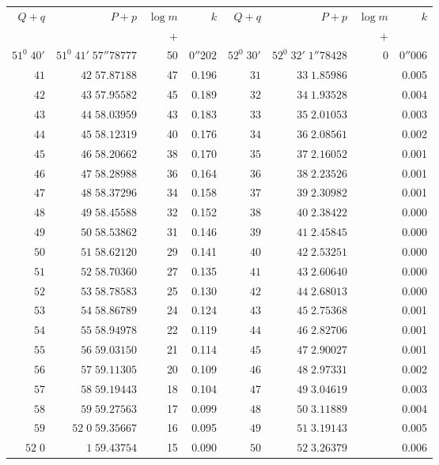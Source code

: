 \clearpage
{}
\begingroup
\fontsize{8}{9}\selectfont
\setlength{\tabcolsep}{3pt}
\renewcommand{\arraystretch}{1.08}
\begin{center}
\begin{tabular}{|r|r|r|r||r|r|r|r|}
\hline
\(Q+q\)&\(P+p\)&\(\log m\)&\(k\)&\(Q+q\)&\(P+p\)&\(\log m\)&\(k\)\\
&&\(+\)&&&&\(+\)&\\\hline
\(51^0\;40'\)&\(51^0\;41'\;57''78777\)&50&\(0''202\)&\(52^0\;30'\)&\(52^0\;32'\;1''78428\)&0&\(0''006\)\\
\(41\)&\(42\;57.87188\)&47&0.196&\(31\)&\(33\;1.85986\)&&0.005\\
\(42\)&\(43\;57.95582\)&45&0.189&\(32\)&\(34\;1.93528\)&&0.004\\
\(43\)&\(44\;58.03959\)&43&0.183&\(33\)&\(35\;2.01053\)&&0.003\\
\(44\)&\(45\;58.12319\)&40&0.176&\(34\)&\(36\;2.08561\)&&0.002\\
\(45\)&\(46\;58.20662\)&38&0.170&\(35\)&\(37\;2.16052\)&&0.001\\
\(46\)&\(47\;58.28988\)&36&0.164&\(36\)&\(38\;2.23526\)&&0.001\\
\(47\)&\(48\;58.37296\)&34&0.158&\(37\)&\(39\;2.30982\)&&0.001\\
\(48\)&\(49\;58.45588\)&32&0.152&\(38\)&\(40\;2.38422\)&&0.000\\
\(49\)&\(50\;58.53862\)&31&0.146&\(39\)&\(41\;2.45845\)&&0.000\\[3pt]
\(50\)&\(51\;58.62120\)&29&0.141&\(40\)&\(42\;2.53251\)&&0.000\\
\(51\)&\(52\;58.70360\)&27&0.135&\(41\)&\(43\;2.60640\)&&0.000\\
\(52\)&\(53\;58.78583\)&25&0.130&\(42\)&\(44\;2.68013\)&&0.000\\
\(53\)&\(54\;58.86789\)&24&0.124&\(43\)&\(45\;2.75368\)&&0.001\\
\(54\)&\(55\;58.94978\)&22&0.119&\(44\)&\(46\;2.82706\)&&0.001\\
\(55\)&\(56\;59.03150\)&21&0.114&\(45\)&\(47\;2.90027\)&&0.001\\
\(56\)&\(57\;59.11305\)&20&0.109&\(46\)&\(48\;2.97331\)&&0.002\\
\(57\)&\(58\;59.19443\)&18&0.104&\(47\)&\(49\;3.04619\)&&0.003\\
\(58\)&\(59\;59.27563\)&17&0.099&\(48\)&\(50\;3.11889\)&&0.004\\
\(59\)&\(52\;0\;59.35667\)&16&0.095&\(49\)&\(51\;3.19143\)&&0.005\\[3pt]
\(52\;0\)&\(1\;59.43754\)&15&0.090&\(50\)&\(52\;3.26379\)&&0.006\\

\end{tabular}
\end{center}
